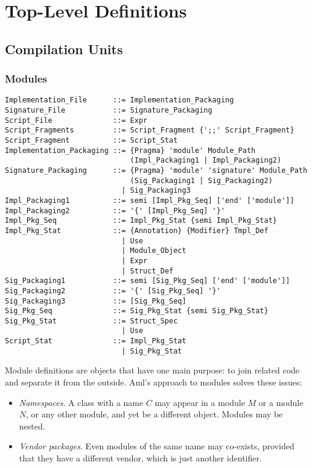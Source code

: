 
\chapter{Top-Level Definitions}

\minitoc

\newpage

\section{Compilation Units}
\label{sec:compilation-units}

\subsection{Modules}
\label{sec:modules}

\syntax\begin{lstlisting}
Implementation_File      ::= Implementation_Packaging
Signature_File           ::= Signature_Packaging
Script_File              ::= Expr
Script_Fragments         ::= Script_Fragment {';;' Script_Fragment}
Script_Fragment          ::= Script_Stat
Implementation_Packaging ::= {Pragma} 'module' Module_Path 
                             (Impl_Packaging1 | Impl_Packaging2)
Signature_Packaging      ::= {Pragma} 'module' 'signature' Module_Path
                             (Sig_Packaging1 | Sig_Packaging2)
                           | Sig_Packaging3
Impl_Packaging1          ::= semi [Impl_Pkg_Seq] ['end' ['module']]
Impl_Packaging2          ::= '{' [Impl_Pkg_Seq] '}'
Impl_Pkg_Seq             ::= Impl_Pkg_Stat {semi Impl_Pkg_Stat}
Impl_Pkg_Stat            ::= {Annotation} {Modifier} Tmpl_Def
                           | Use
                           | Module_Object
                           | Expr
                           | Struct_Def
Sig_Packaging1           ::= semi [Sig_Pkg_Seq] ['end' ['module']]
Sig_Packaging2           ::= '{' [Sig_Pkg_Seq] '}'
Sig_Packaging3           ::= [Sig_Pkg_Seq]
Sig_Pkg_Seq              ::= Sig_Pkg_Stat {semi Sig_Pkg_Stat}
Sig_Pkg_Stat             ::= Struct_Spec
                           | Use
Script_Stat              ::= Impl_Pkg_Stat
                           | Sig_Pkg_Stat
\end{lstlisting}

Module definitions are objects that have one main purpose: to join related code and separate it from the outside. Aml's approach to modules solves these issues: 
\begin{itemize}
  \item {\em Namespaces}. A class with a name $C$ may appear in a module $M$ or a module $N$, or any other module, and yet be a different object. Modules may be nested.
  \item {\em Vendor packages}. Even modules of the same name may co-exists, provided that they have a different vendor, which is just another identifier. 
\end{itemize}

